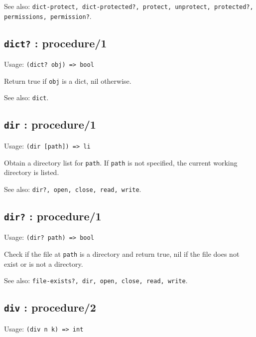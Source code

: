 \documentclass[
]{article}
\newcommand{\passthrough}[1]{#1}
\begin{document}
See also:
\passthrough{\lstinline!dict-protect, dict-protected?, protect, unprotect, protected?, permissions, permission?!}.

\hypertarget{dict-procedure1-1}{%
\subsection{\texorpdfstring{\texttt{dict?} :
procedure/1}{dict? : procedure/1}}\label{dict-procedure1-1}}

Usage: \passthrough{\lstinline!(dict? obj) => bool!}

Return true if \passthrough{\lstinline!obj!} is a dict, nil otherwise.

See also: \passthrough{\lstinline!dict!}.

\hypertarget{dir-procedure1-2}{%
\subsection{\texorpdfstring{\texttt{dir} :
procedure/1}{dir : procedure/1}}\label{dir-procedure1-2}}

Usage: \passthrough{\lstinline!(dir [path]) => li!}

Obtain a directory list for \passthrough{\lstinline!path!}. If
\passthrough{\lstinline!path!} is not specified, the current working
directory is listed.

See also: \passthrough{\lstinline!dir?, open, close, read, write!}.

\hypertarget{dir-procedure1-3}{%
\subsection{\texorpdfstring{\texttt{dir?} :
procedure/1}{dir? : procedure/1}}\label{dir-procedure1-3}}

Usage: \passthrough{\lstinline!(dir? path) => bool!}

Check if the file at \passthrough{\lstinline!path!} is a directory and
return true, nil if the file does not exist or is not a directory.

See also:
\passthrough{\lstinline!file-exists?, dir, open, close, read, write!}.

\hypertarget{div-procedure2-1}{%
\subsection{\texorpdfstring{\texttt{div} :
procedure/2}{div : procedure/2}}\label{div-procedure2-1}}

Usage: \passthrough{\lstinline!(div n k) => int!}
\end{document}
